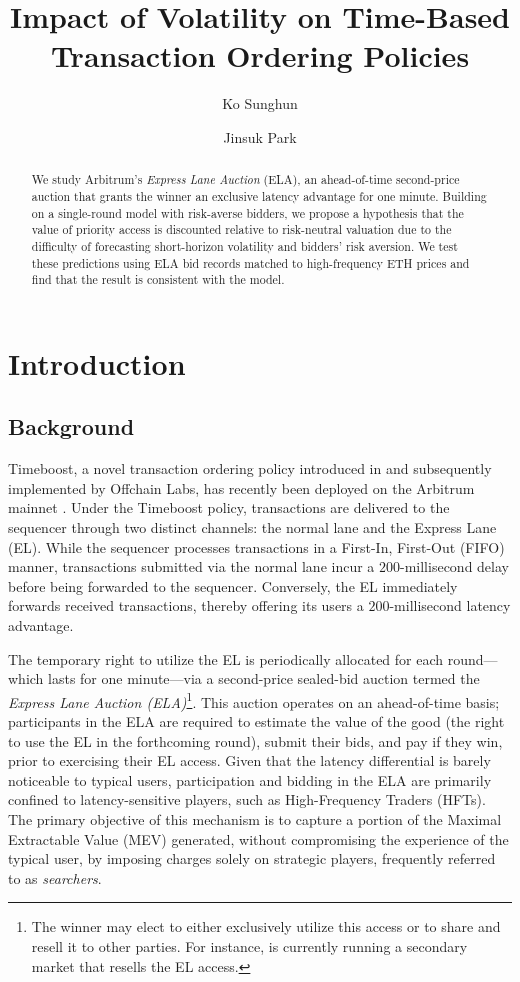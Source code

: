 \documentclass[runningheads]{llncs}
\title{Impact of Volatility on Time-Based Transaction Ordering Policies}
\author{Ko Sunghun\inst{1,2} \and Jinsuk Park\inst{1}}
\institute{
  Matroos Labs \and
  Department of Mathematical Sciences, KAIST, Daejeon, Republic of Korea\\
  \email{\{kosunghun317,jinsuk\}@matroos.xyz}
}
\begin{document}
\maketitle

\begin{abstract}
We study Arbitrum’s \emph{Express Lane Auction} (ELA), an ahead-of-time second-price auction that grants the winner an exclusive latency advantage for one minute. Building on a single-round model with risk-averse bidders, we propose a hypothesis that the value of priority access is discounted relative to risk-neutral valuation due to the difficulty of forecasting short-horizon volatility and bidders' risk aversion. We test these predictions using ELA bid records matched to high-frequency ETH prices and find that the result is consistent with the model.
\end{abstract}


\section{Introduction}
\subsection{Background}
Timeboost, a novel transaction ordering policy introduced in \cite{mamageishvili2023buying} and subsequently implemented by Offchain Labs, has recently been deployed on the Arbitrum mainnet \cite{offchainlabs2025timeboost}. Under the Timeboost policy, transactions are delivered to the sequencer through two distinct channels: the normal lane and the Express Lane (EL). While the sequencer processes transactions in a First-In, First-Out (FIFO) manner, transactions submitted via the normal lane incur a $200$-millisecond delay before being forwarded to the sequencer. Conversely, the EL immediately forwards received transactions, thereby offering its users a $200$-millisecond latency advantage.

The temporary right to utilize the EL is periodically allocated for each round—which lasts for one minute—via a second-price sealed-bid auction termed the \emph{Express Lane Auction (ELA)}\footnote{The winner may elect to either exclusively utilize this access or to share and resell it to other parties. For instance, \cite{kairossubauction} is currently running a secondary market that resells the EL access.}. This auction operates on an ahead-of-time basis; participants in the ELA are required to estimate the value of the good (the right to use the EL in the forthcoming round), submit their bids, and pay if they win, prior to exercising their EL access. Given that the latency differential is barely noticeable to typical users, participation and bidding in the ELA are primarily confined to latency-sensitive players, such as High-Frequency Traders (HFTs). The primary objective of this mechanism is to capture a portion of the Maximal Extractable Value (MEV) generated, without compromising the experience of the typical user, by imposing charges solely on strategic players, frequently referred to as \emph{searchers}. 
\end{document}
